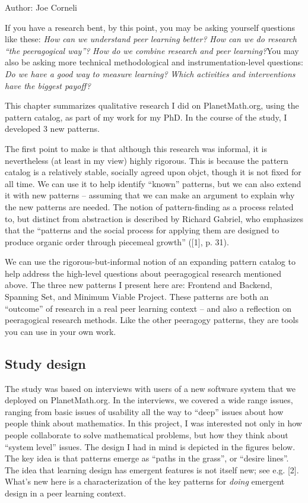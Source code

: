 Author: Joe Corneli

If you have a research bent, by this point, you may be asking yourself
questions like these: \emph{How can we understand peer learning better?}
\emph{How can we do research ``the peeragogical way''?} \emph{How do we
combine research and peer learning?}You may also be asking more
technical methodological and instrumentation-level questions: \emph{Do
we have a good way to measure learning?} \emph{Which activities and
interventions have the biggest payoff?} 

This chapter summarizes qualitative
research I did on PlanetMath.org, using the pattern catalog,
as part of my work for my PhD.  In the course of the study, I developed 3
new patterns. 

The first point to make is that although this research was informal,
it is nevertheless (at least in my view) highly rigorous. This is
because the pattern catalog is a relatively stable, socially agreed
upon objct, though it is not fixed for all time.  We can use it to
help identify ``known'' patterns, but we can also extend it with new
patterns -- assuming that we can make an argument to explain why the
new patterns are needed.  The notion of pattern-finding as a process
related to, but distinct from abstraction is described by Richard
Gabriel, who emphasizes that the ``patterns and the social process for
applying them are designed to produce organic order through piecemeal
growth'' ({[}1{]}, p. 31).  

We can use the rigorous-but-informal notion of an expanding pattern
catalog to help address the high-level questions about peeragogical
research mentioned above. The three new patterns I present here are:
Frontend and Backend, Spanning Set, and Minimum Viable Project. These
patterns are both an ``outcome'' of research in a real peer learning
context -- and also a reflection on peeragogical research methods. Like
the other peeragogy patterns, they are tools you can use in your own
work.

\subsection{Study design}

The study was based on interviews with users of a new software system
that we deployed on PlanetMath.org. In the interviews, we covered a wide
range issues, ranging from basic issues of usability all the way to
``deep'' issues about how people think about mathematics. In this
project, I was interested not only in how people collaborate to solve
mathematical problems, but how they think about ``system level'' issues.
The design I had in mind is depicted in the figures below. The key idea
is that patterns emerge as ``paths in the grass'', or ``desire lines''.
The idea that learning design has emergent features is not itself new;
see e.g. {[}2{]}. What's new here is a characterization of the key
patterns for \emph{doing} emergent design in a peer learning context.

